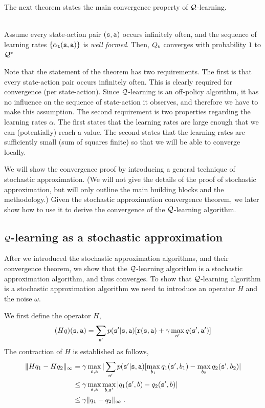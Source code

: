 The next theorem states the main convergence property of
$\mathcal{Q}$-learning.
\begin{theorem}\ \\
\label{thm:Q-learning} Assume every state-action pair
$({\tt s},{\tt a})$ occurs infinitely often, and the sequence of learning rates $\{\alpha_{\tt t}({\tt s},{\tt a})\}$ is \emph{well formed}.
Then, $Q_{\tt t}$ converges with probability $1$ to $\mathcal{Q}^*$
\end{theorem}

Note that the statement of the theorem has two requirements. The
first is that every state-action pair occurs infinitely often.
This is clearly required for convergence (per state-action). Since
$\mathcal{Q}$-learning is an off-policy algorithm, it has no influence on the sequence
of state-action it observes, and therefore we have to make this
assumption. The second requirement is two properties regarding the
learning rates $\alpha$. The first states that the learning rates
are large enough that we can (potentially) reach a value. The
second states that the learning rates are sufficiently small (sum of
squares finite) so that we will be able to converge locally.

We will show the convergence proof by introducing a general technique
of stochastic approximation. (We will not give the details of the
proof of stochastic approximation, but will only outline the main
building blocks and the methodology.) Given the stochastic
approximation convergence theorem, we later show how to use it to
derive the convergence of the $\mathcal{Q}$-learning algorithm.




\subsection{$\mathcal{Q}$-learning as a stochastic approximation}

After we introduced the stochastic approximation algorithms, and
their convergence theorem, we show that the $\mathcal{Q}$-learning algorithm
is a stochastic approximation algorithm, and thus converges.
%
To show that $\mathcal{Q}$-learning algorithm is a stochastic approximation
algorithm we need to introduce an operator $H$ and the noise
$\omega$.

We first define the operator $H$,
\[
(Hq)({\tt s},{\tt a})=\sum_{{\tt s}'}p({\tt s}'|{\tt s},{\tt a})
[{\tt r}({\tt s},{\tt a}) + \gamma \max_{{\tt a}'} q ({\tt s}',
{\tt a}')]
\]
The contraction of $H$ is established as follows,
\begin{align*}
\|Hq_1-Hq_2\|_\infty &= \gamma \max_{{\tt s},{\tt a}}
|\sum_{{\tt s}'} p({\tt s}'|{\tt s},{\tt a})
[\max_{b_1} q_1({\tt s}',b_1)-\max_{b_2} q_2({\tt s}',b_2)|\\
&\leq \gamma \max_{{\tt s},{\tt a}}\max_{b,{\tt s}'} |q_1({\tt s}',b)-q_2({\tt s}',b)|\\
&\leq \gamma \|q_1-q_2\|_\infty\;.
\end{align*}



